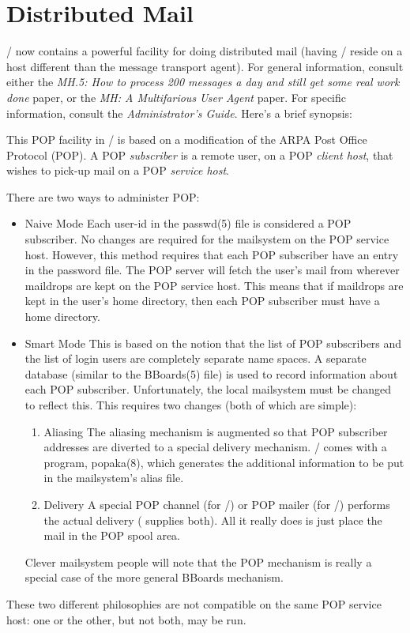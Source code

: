 \section*	{Distributed Mail}
\MH/ now contains a powerful facility for doing distributed mail
(having \MH/ reside on a host different than the message transport agent).
For general information,
consult either the 
{\em MH.5: How to process 200 messages a day and still get some real work
done} paper,
or the {\em MH: A Multifarious User Agent} paper.
For specific information,
consult the {\em Administrator's Guide}.
Here's a brief synopsis:

This POP facility in \MH/ is based on a modification of the ARPA Post
Office Protocol (POP).
A POP {\em subscriber\/} is a remote user,
on a POP {\em client host},
that wishes to pick-up mail on a POP {\em service host}.

There are two ways to administer POP:
\begin{itemize}
\item	Naive Mode\hbreak
Each user-id in the \man passwd(5) file is considered a POP subscriber.
No changes are required for the mailsystem on the POP service host.
However,
this method requires that each POP subscriber have an entry in the password
file.
The POP server will fetch the user's mail from wherever maildrops are kept on
the POP service host.
This means that if maildrops are kept in the user's home directory,
then each POP subscriber must have a home directory.

\item	Smart Mode\hbreak
This is based on the notion that the list of POP subscribers and the list of
login users are completely separate name spaces.
A separate database (similar to the \man BBoards(5) file)
is used to record information about each POP subscriber.
Unfortunately,
the local mailsystem must be changed to reflect this.
This requires two changes (both of which are simple):
\begin{enumerate}
\item	Aliasing\hbreak
	The aliasing mechanism is augmented so that POP subscriber addresses
	are diverted to a special delivery mechanism.
	\MH/ comes with a program, \man popaka(8), which generates the
	additional information to be put in the mailsystem's alias file.
\item	Delivery\hbreak
	A special POP channel (for \MMDFII/) or POP mailer (for \SendMail/)
	performs the actual delivery ( supplies both).
	All it really does is just place the mail in the POP spool area.
\end{enumerate}
Clever mailsystem people will note that
the POP mechanism is really a special case of the more general
BBoards mechanism.
\end{itemize}
These two different philosophies are not compatible on the same POP service
host: one or the other, but not both, may be run.

